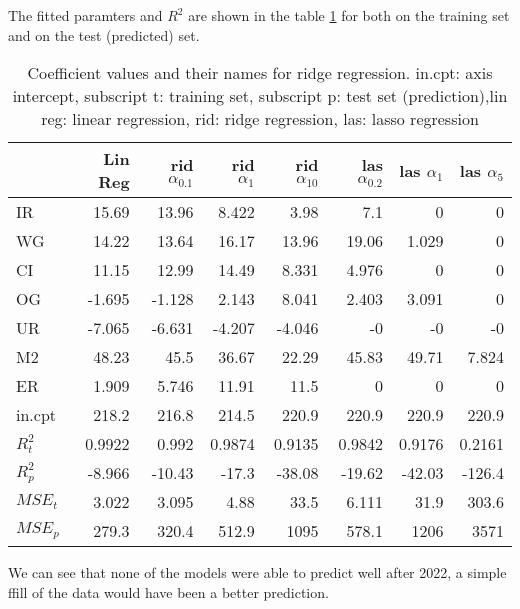 \documentclass{article}
\begin{document}
The fitted paramters and $R^2$ are shown in the table \ref{tab:ridge_coefficients}
for both on the training set and on the test (predicted) set.
\begin{table}
      \caption{Coefficient values and their names for ridge regression. in.cpt: axis intercept, subscript t: training set, subscript p: test set (prediction),lin reg: linear regression, rid: ridge regression, las: lasso regression}
      \label{tab:ridge_coefficients}
      \begin{tabular}{lrrrrrrr}
            \toprule
                    & Lin Reg & rid $\alpha_{0.1}$ & rid $\alpha_{1}$ & rid $\alpha_{10}$ & las $\alpha_{0.2}$ & las $\alpha_{1}$ & las $\alpha_{5}$ \\
            \midrule
            IR      & 15.69   & 13.96              & 8.422            & 3.98              & 7.1                & 0                & 0                \\
            WG      & 14.22   & 13.64              & 16.17            & 13.96             & 19.06              & 1.029            & 0                \\
            CI      & 11.15   & 12.99              & 14.49            & 8.331             & 4.976              & 0                & 0                \\
            OG      & -1.695  & -1.128             & 2.143            & 8.041             & 2.403              & 3.091            & 0                \\
            UR      & -7.065  & -6.631             & -4.207           & -4.046            & -0                 & -0               & -0               \\
            M2      & 48.23   & 45.5               & 36.67            & 22.29             & 45.83              & 49.71            & 7.824            \\
            ER      & 1.909   & 5.746              & 11.91            & 11.5              & 0                  & 0                & 0                \\
            in.cpt  & 218.2   & 216.8              & 214.5            & 220.9             & 220.9              & 220.9            & 220.9            \\
            $R^2_t$ & 0.9922  & 0.992              & 0.9874           & 0.9135            & 0.9842             & 0.9176           & 0.2161           \\
            $R^2_p$ & -8.966  & -10.43             & -17.3            & -38.08            & -19.62             & -42.03           & -126.4           \\
            $MSE_t$ & 3.022   & 3.095              & 4.88             & 33.5              & 6.111              & 31.9             & 303.6            \\
            $MSE_p$ & 279.3   & 320.4              & 512.9            & 1095              & 578.1              & 1206             & 3571             \\
            \bottomrule
      \end{tabular}
\end{table}
We can see that none of the models were able to predict well after 2022,
a simple ffill of the data would have been a better prediction.
\end{document}
